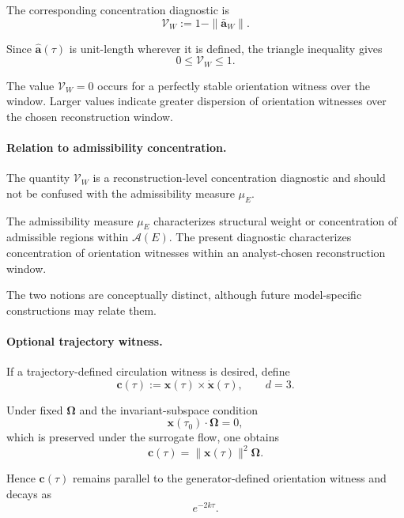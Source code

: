 \documentclass[aps,prx,onecolumn,11pt]{revtex4-2}
\theoremstyle{plain}
\theoremstyle{definition}
\theoremstyle{remark}
\begin{document}
The corresponding concentration diagnostic is
\begin{equation}
\mathcal V_W
:=
1
-
\|
\bar{\mathbf a}_W
\|.
\label{eq:toy_axis_vector_variance}
\end{equation}

Since \(\widehat{\mathbf a}(\tau)\) is unit-length wherever it is
defined, the triangle inequality gives
\[
0
\leq
\mathcal V_W
\leq
1.
\]

The value \(\mathcal V_W=0\) occurs for a perfectly stable orientation
witness over the window. Larger values indicate greater dispersion of
orientation witnesses over the chosen reconstruction window.

\paragraph{Relation to admissibility concentration.}

The quantity \(\mathcal V_W\) is a reconstruction-level concentration
diagnostic and should not be confused with the admissibility measure
\(\mu_E\).

The admissibility measure \(\mu_E\) characterizes structural weight or
concentration of admissible regions within \(\mathcal A(E)\). The
present diagnostic characterizes concentration of orientation witnesses
within an analyst-chosen reconstruction window.

The two notions are conceptually distinct, although future
model-specific constructions may relate them.

\paragraph{Optional trajectory witness.}

If a trajectory-defined circulation witness is desired, define
\begin{equation}
\mathbf c(\tau)
:=
\mathbf x(\tau)
\times
\dot{\mathbf x}(\tau),
\qquad
d=3.
\label{eq:toy_circ_witness}
\end{equation}

Under fixed \(\boldsymbol{\Omega}\) and the invariant-subspace
condition
\[
\mathbf x(\tau_0)\cdot\boldsymbol{\Omega}=0,
\]
which is preserved under the surrogate flow, one obtains
\begin{equation}
\mathbf c(\tau)
=
\|\mathbf x(\tau)\|^2
\boldsymbol{\Omega}.
\label{eq:toy_circ_witness_parallel}
\end{equation}

Hence \(\mathbf c(\tau)\) remains parallel to the generator-defined
orientation witness and decays as
\[
e^{-2k\tau}.
\]
\end{document}
